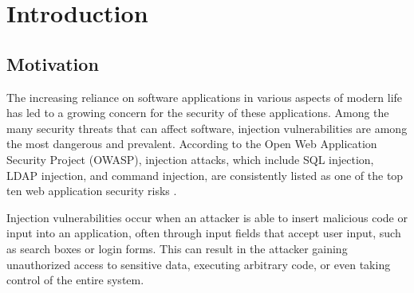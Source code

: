 \chapter{Introduction}
\label{chapter:introduction}

\begin{comment}
	Your introduction goes here
	\begin{itemize}
		\item Generic description of the broad field of research
		\item Current state of research
		\item What's the gap that you're trying to fill?
		\item Short motivation
		\item Summary of the most important results
		\item Your contribution
		\item Structure of the thesis
	\end{itemize}
	
	1-2.5 pages
	
	This text is not too detailed. Start quite high-level, then narrow down until
	you reach your topic. After the introduction, the reader must want to read the
	rest of your thesis and understand the relevance. However, it doesn't have to
	be super technical.
\end{comment}

\section{Motivation}

The increasing reliance on software applications in various aspects of modern life has led to a growing concern for the security of these applications. Among the many security threats that can affect software, injection vulnerabilities are among the most dangerous and prevalent. According to the Open Web Application Security Project (OWASP), injection attacks, which include SQL injection, LDAP injection, and command injection, are consistently listed as one of the top ten web application security risks \cite{owasp}.

Injection vulnerabilities occur when an attacker is able to insert malicious code or input into an application, often through input fields that accept user input, such as search boxes or login forms. This can result in the attacker gaining unauthorized access to sensitive data, executing arbitrary code, or even taking control of the entire system.

